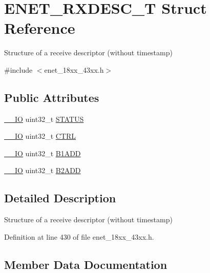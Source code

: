 \hypertarget{struct_e_n_e_t___r_x_d_e_s_c___t}{}\section{E\+N\+E\+T\+\_\+\+R\+X\+D\+E\+S\+C\+\_\+T Struct Reference}
\label{struct_e_n_e_t___r_x_d_e_s_c___t}


Structure of a receive descriptor (without timestamp)  




{\ttfamily \#include $<$enet\+\_\+18xx\+\_\+43xx.\+h$>$}

\subsection*{Public Attributes}
\begin{DoxyCompactItemize}
\item 
\hyperlink{core__sc300_8h_aec43007d9998a0a0e01faede4133d6be}{\+\_\+\+\_\+\+IO} uint32\+\_\+t \hyperlink{struct_e_n_e_t___r_x_d_e_s_c___t_a4a278a13209dc37929831c98390f8cbb}{S\+T\+A\+T\+US}
\item 
\hyperlink{core__sc300_8h_aec43007d9998a0a0e01faede4133d6be}{\+\_\+\+\_\+\+IO} uint32\+\_\+t \hyperlink{struct_e_n_e_t___r_x_d_e_s_c___t_ae2b47d39165d964fe15d08e3e1e96d27}{C\+T\+RL}
\item 
\hyperlink{core__sc300_8h_aec43007d9998a0a0e01faede4133d6be}{\+\_\+\+\_\+\+IO} uint32\+\_\+t \hyperlink{struct_e_n_e_t___r_x_d_e_s_c___t_a041c83f41c2f1dba68e0d695804629dd}{B1\+A\+DD}
\item 
\hyperlink{core__sc300_8h_aec43007d9998a0a0e01faede4133d6be}{\+\_\+\+\_\+\+IO} uint32\+\_\+t \hyperlink{struct_e_n_e_t___r_x_d_e_s_c___t_ac21f4fd9b75b21aa5369a37855a75f72}{B2\+A\+DD}
\end{DoxyCompactItemize}


\subsection{Detailed Description}
Structure of a receive descriptor (without timestamp) 

Definition at line 430 of file enet\+\_\+18xx\+\_\+43xx.\+h.



\subsection{Member Data Documentation}
\mbox{\label{struct_e_n_e_t___r_x_d_e_s_c___t_a041c83f41c2f1dba68e0d695804629dd}} 
